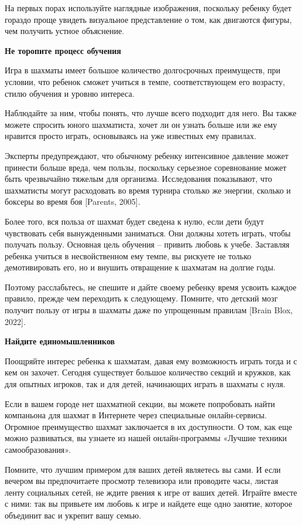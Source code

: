 На первых порах используйте наглядные изображения, поскольку ребенку будет гораздо проще увидеть визуальное представление о том, как двигаются фигуры, чем получить устное объяснение.

\textbf{Не торопите процесс обучения}

Игра в шахматы имеет большое количество долгосрочных преимуществ, при условии, что ребенок сможет учиться в темпе, соответствующем его возрасту, стилю обучения и уровню интереса.

Наблюдайте за ним, чтобы понять, что лучше всего подходит для него. Вы также можете спросить юного шахматиста, хочет ли он узнать больше или же ему нравится просто играть, основываясь на уже известных ему правилах.

Эксперты предупреждают, что обычному ребенку интенсивное давление может принести больше вреда, чем пользы, поскольку серьезное соревнование может быть чрезвычайно тяжелым для организма. Исследования показывают, что шахматисты могут расходовать во время турнира столько же энергии, сколько и боксеры во время боя [Parents, 2005].

Более того, вся польза от шахмат будет сведена к нулю, если дети будут чувствовать себя вынужденными заниматься. Они должны хотеть играть, чтобы получать пользу. Основная цель обучения – привить любовь к учебе. Заставляя ребенка учиться в несвойственном ему темпе, вы рискуете не только демотивировать его, но и внушить отвращение к шахматам на долгие годы.

Поэтому расслабьтесь, не спешите и дайте своему ребенку время усвоить каждое правило, прежде чем переходить к следующему. Помните, что детский мозг получит пользу от игры в шахматы даже по упрощенным правилам [Brain Blox, 2022].

\textbf{Найдите единомышленников}

Поощряйте интерес ребенка к шахматам, давая ему возможность играть тогда и с кем он захочет. Сегодня существует большое количество секций и кружков, как для опытных игроков, так и для детей, начинающих играть в шахматы с нуля.

Если в вашем городе нет шахматной секции, вы можете попробовать найти компаньона для шахмат в Интернете через специальные онлайн-сервисы. Огромное преимущество шахмат заключается в их доступности. О том, как еще можно развиваться, вы узнаете из нашей онлайн-программы «Лучшие техники самообразования».

Помните, что лучшим примером для ваших детей являетесь вы сами. И если вечером вы предпочитаете просмотр телевизора или проводите часы, листая ленту социальных сетей, не ждите рвения к игре от ваших детей. Играйте вместе с ними: так вы привьете им любовь к игре и найдете еще одно занятие, которое объединит вас и укрепит вашу семью.

